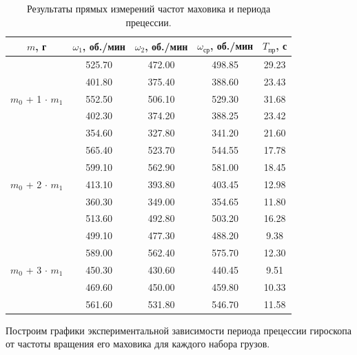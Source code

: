\documentclass[12pt, a4paper]{article}
\begin{document}
\begin{table}[H]
\begin{center}
\begin{tabular}{|c|c|c|c|c|}
\hline 
$m$, г & $\omega_1$, об./мин & $\omega_2$, об./мин & $\omega_{\text{ср}}$, об./мин & $T_\text{пр}$, с\\ 
\hline 
\multirow{5}{*}{$m_0$ + 1 $\cdot$ $m_1$} & 525.70 & 472.00 & 498.85 & 29.23\\ 
\cline{2-5} 
 & 401.80 & 375.40 & 388.60 & 23.43\\ 
\cline{2-5} 
 & 552.50 & 506.10 & 529.30 & 31.68\\ 
\cline{2-5} 
 & 402.30 & 374.20 & 388.25 & 23.42\\ 
\cline{2-5} 
 & 354.60 & 327.80 & 341.20 & 21.60\\ 
\cline{2-5} 
\hline 
\multirow{5}{*}{$m_0$ + 2 $\cdot$ $m_1$} & 565.40 & 523.70 & 544.55 & 17.78\\ 
\cline{2-5} 
 & 599.10 & 562.90 & 581.00 & 18.45\\ 
\cline{2-5} 
 & 413.10 & 393.80 & 403.45 & 12.98\\ 
\cline{2-5} 
 & 360.30 & 349.00 & 354.65 & 11.80\\ 
\cline{2-5} 
 & 513.60 & 492.80 & 503.20 & 16.28\\ 
\cline{2-5} 
\hline 
\multirow{5}{*}{$m_0$ + 3 $\cdot$ $m_1$} & 499.10 & 477.30 & 488.20 & 9.38\\ 
\cline{2-5} 
 & 589.00 & 562.40 & 575.70 & 12.30\\ 
\cline{2-5} 
 & 450.30 & 430.60 & 440.45 & 9.51\\ 
\cline{2-5} 
 & 469.60 & 450.00 & 459.80 & 10.33\\ 
\cline{2-5} 
 & 561.60 & 531.80 & 546.70 & 11.58\\ 
\cline{2-5} 
\hline 

\end{tabular}
\caption{Результаты прямых измерений частот маховика и периода прецессии.}
\label{tab:1}
\end{center}
\end{table}

Построим графики экспериментальной зависимости периода прецессии гироскопа от частоты вращения его маховика для каждого набора грузов.
\end{document}
